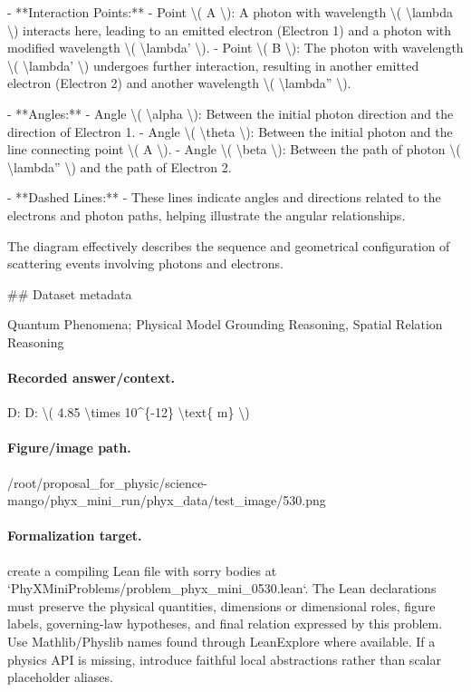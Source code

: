 - **Interaction Points:**
  - Point \textbackslash{}( A \textbackslash{}): A photon with wavelength \textbackslash{}( \textbackslash{}lambda \textbackslash{}) interacts here, leading to an emitted electron (Electron 1) and a photon with modified wavelength \textbackslash{}( \textbackslash{}lambda' \textbackslash{}).
  - Point \textbackslash{}( B \textbackslash{}): The photon with wavelength \textbackslash{}( \textbackslash{}lambda' \textbackslash{}) undergoes further interaction, resulting in another emitted electron (Electron 2) and another wavelength \textbackslash{}( \textbackslash{}lambda'' \textbackslash{}).

- **Angles:**
  - Angle \textbackslash{}( \textbackslash{}alpha \textbackslash{}): Between the initial photon direction and the direction of Electron 1.
  - Angle \textbackslash{}( \textbackslash{}theta \textbackslash{}): Between the initial photon and the line connecting point \textbackslash{}( A \textbackslash{}).
  - Angle \textbackslash{}( \textbackslash{}beta \textbackslash{}): Between the path of photon \textbackslash{}( \textbackslash{}lambda'' \textbackslash{}) and the path of Electron 2.

- **Dashed Lines:**
  - These lines indicate angles and directions related to the electrons and photon paths, helping illustrate the angular relationships.

The diagram effectively describes the sequence and geometrical configuration of scattering events involving photons and electrons.

\#\# Dataset metadata

Quantum Phenomena; Physical Model Grounding Reasoning, Spatial Relation Reasoning

\paragraph{Recorded answer/context.}
D: D: \textbackslash{}( 4.85 \textbackslash{}times 10\textasciicircum{}\{-12\} \textbackslash{}text\{ m\} \textbackslash{})

\paragraph{Figure/image path.}
/root/proposal\_for\_physic/science-mango/phyx\_mini\_run/phyx\_data/test\_image/530.png

\paragraph{Formalization target.}
create a compiling Lean file with sorry bodies at `PhyXMiniProblems/problem\_phyx\_mini\_0530.lean`. The Lean declarations must preserve the physical quantities, dimensions or dimensional roles, figure labels, governing-law hypotheses, and final relation expressed by this problem.
Use Mathlib/Physlib names found through LeanExplore where available. If a physics API is missing, introduce faithful local abstractions rather than scalar placeholder aliases.

